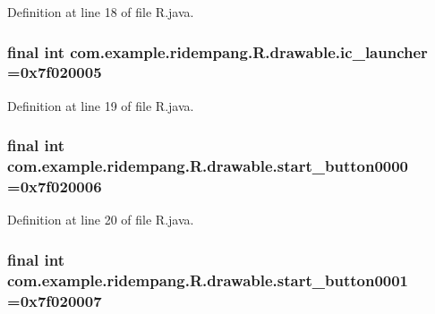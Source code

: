 Definition at line 18 of file R.\-java.

\hypertarget{classcom_1_1example_1_1ridempang_1_1_r_1_1drawable_ad36764a70a85092d2838e00a5b8eb71e}{
\subsubsection[{ic\-\_\-launcher}]{\setlength{\rightskip}{0pt plus 5cm}final int com.\-example.\-ridempang.\-R.\-drawable.\-ic\-\_\-launcher =0x7f020005\hspace{0.3cm}{\ttfamily [static]}}}\label{classcom_1_1example_1_1ridempang_1_1_r_1_1drawable_ad36764a70a85092d2838e00a5b8eb71e}


Definition at line 19 of file R.\-java.

\hypertarget{classcom_1_1example_1_1ridempang_1_1_r_1_1drawable_aac533a3d2fcf50231495fe1ea5cb5c90}{
\subsubsection[{start\-\_\-button0000}]{\setlength{\rightskip}{0pt plus 5cm}final int com.\-example.\-ridempang.\-R.\-drawable.\-start\-\_\-button0000 =0x7f020006\hspace{0.3cm}{\ttfamily [static]}}}\label{classcom_1_1example_1_1ridempang_1_1_r_1_1drawable_aac533a3d2fcf50231495fe1ea5cb5c90}


Definition at line 20 of file R.\-java.

\hypertarget{classcom_1_1example_1_1ridempang_1_1_r_1_1drawable_aa4ab2e0df25efd870529966d6c8ebb07}{
\subsubsection[{start\-\_\-button0001}]{\setlength{\rightskip}{0pt plus 5cm}final int com.\-example.\-ridempang.\-R.\-drawable.\-start\-\_\-button0001 =0x7f020007\hspace{0.3cm}{\ttfamily [static]}}}\label{classcom_1_1example_1_1ridempang_1_1_r_1_1drawable_aa4ab2e0df25efd870529966d6c8ebb07}


